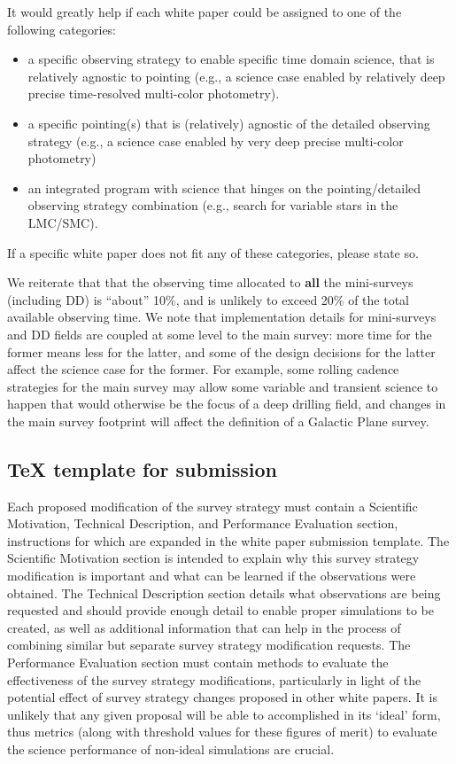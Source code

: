 \documentclass[DM,lsstdraft,toc,usenatbib]{lsstdoc}
\begin{document}
It would greatly help if each white paper could be assigned to one of the following
categories:  
\begin{itemize} 
\item a specific observing strategy to enable specific time domain science, 
	that is relatively agnostic to pointing (e.g., a science case enabled 
	by relatively deep precise time-resolved multi-color photometry). 
\item a specific pointing(s) that is (relatively) agnostic of the detailed observing 
	strategy (e.g., a science case enabled by very deep precise multi-color 
	photometry) 
\item an integrated program with science that hinges on the pointing/detailed 
	observing strategy combination (e.g., search for variable stars in the 
	LMC/SMC). 
\end{itemize}  
If a specific white paper does not fit any of these categories, please state so.

We reiterate that that the observing time allocated to {\bf all} the mini-surveys 
(including DD) is ``about'' 10\%, and is unlikely to exceed 20\% of the total available
observing time. We note that implementation details for mini-surveys and DD fields 
are coupled at some level to the main survey: more time for the former means less 
for the latter, and some of the design decisions for the latter affect the science
case for the former.  For example, some rolling cadence strategies for the main survey  
may allow some variable and transient science to happen that would otherwise be the 
focus of a deep drilling field, and changes in the main survey footprint will affect the 
definition of a Galactic Plane survey. 


\subsection{TeX template for submission} 

Each proposed modification of the survey strategy must contain a Scientific Motivation, Technical Description, and Performance Evaluation section, instructions for which are expanded in the white paper submission template. The Scientific Motivation section is intended to explain why this survey strategy modification is important and what can be learned if the observations were obtained. The Technical Description section details what observations are being requested and should provide enough detail to enable proper simulations to be created, as well as additional information that can help in the process of combining similar but separate survey strategy modification requests. The Performance Evaluation section must contain methods to evaluate the effectiveness of the survey strategy modifications, particularly in light of the potential effect of survey strategy changes proposed in other white papers. It is unlikely that any given proposal will be able to accomplished in its `ideal' form, thus metrics (along with threshold values for these figures of merit) to evaluate the science performance of non-ideal simulations are crucial. 
\end{document}
